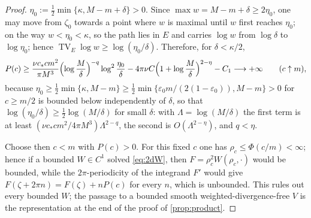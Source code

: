 \documentclass[11pt]{article}
\theoremstyle{definition}
\begin{document}
\begin{proof}
$\eta_0:=\tfrac12\min\{\kappa,M-m+\delta\}>0$. Since
$\max w=M-m+\delta\ge2\eta_0$, one may move from $\zeta_0$ towards a point
where $w$ is maximal until $w$
first reaches $\eta_0$; on the way $w<\eta_0<\kappa$, so the path lies in $E$
and carries
$\log w$ from $\log\delta$ to $\log\eta_0$; hence
$\operatorname{TV}_E\log w\ge\log(\eta_0/\delta)$. Therefore, for
$\delta<\kappa/2$,
\begin{equation}
P(c)\ge\frac{\nu c_*cm^2}{\pi M^3}
\Bigl(\log\frac M\delta\Bigr)^{-q}\log^2\frac{\eta_0}{\delta}
-4\pi\nu C\Bigl(1+\log\frac M\delta\Bigr)^{2-\eta}-C_1
\longrightarrow+\infty\qquad(c\uparrow m),
\end{equation}
because $\eta_0\ge\tfrac12\min\{\kappa,M-m\}\ge
\tfrac12\min\{\varepsilon_0m/(2(1-\varepsilon_0)),M-m\}>0$ for $c\ge m/2$ is
bounded below independently of $\delta$, so that
$\log(\eta_0/\delta)\ge\tfrac12\log(M/\delta)$ for small $\delta$: with
$\Lambda=\log(M/\delta)$ the first term is at least
$(\nu c_*cm^2/4\pi M^3)\Lambda^{2-q}$, the second is $O(\Lambda^{2-\eta})$,
and $q<\eta$.

Choose then $c<m$ with $P(c)>0$. For this fixed $c$ one has
$\rho_c\le\Phi(c/m)<\infty$; hence if a bounded $W\in C^1$ solved
\eqref{eq:2dW}, then $F=\rho_c^2W(\rho_c,\cdot)$ would be bounded, while the
$2\pi$-periodicity of the integrand $F'$ would give
$F(\zeta+2\pi n)=F(\zeta)+nP(c)$ for every $n$, which is unbounded. This rules out every bounded $W$; the passage to a bounded smooth
weighted-divergence-free $V$ is the representation at the end of the proof of
\cref{prop:product}.
\end{proof}
\end{document}

